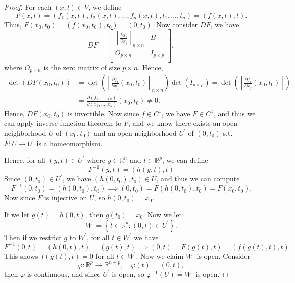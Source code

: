 \begin{proof}
    For each \((x, t) \in V\), we define 
    \[
        F(x, t) = (f_1(x, t), f_2(x, t), \dots , f_n(x, t), t_1, \dots , t_n) = (f(x, t), t).
    \] 
    Thus, \(F(x_0, t_0) = (f(x_0, t_0), t_0) = (0, t_0)\). Now consider \(DF\), we have 
    \[
        DF = \begin{bmatrix}
            \left[ \frac{\partial f_i}{\partial x_j}  \right]_{n \times n}  & B \\
            O_{p \times n} & I_{p \times p}  \\
        \end{bmatrix},
    \]  
    where \(O_{p \times n}\) is the zero matrix of size \(p \times n\). Hence,
    \begin{align*}
        \det (DF(x_0, t_0)) &= \det \left( \left[ \frac{\partial f_i}{\partial x_j} (x_0, t_0) \right]_{n \times n}   \right) \det (I_{p \times p}) = \det \left( \left[ \frac{\partial f_i}{\partial x_j} (x_0, t_0) \right]  \right) \\
        &= \frac{\partial (f_1, \dots , f_n)}{\partial (x_1, \dots , x_n)}(x_0, t_0) \neq 0.
    \end{align*} 
    Hence, \(DF(x_0, t_0)\) is invertible. Now since \(f \in C^1\), we have \(F \in C^1\), and thus we can apply inverse function theorem to \(F\), and we know there exists an open neighborhood \(U\) of \((x_0, t_0)\) and an open neighborhood \(U^{\prime} \) of \((0, t_0)\) s.t. \(F: U \to U^{\prime} \) is a homeomorphism.
    
    Hence, for all \((y, t) \in U^{\prime} \) where \(y \in \mathbb{R} ^n\) and \(t \in \mathbb{R} ^p\), we can define 
    \[
        F^{-1}(y, t) = (h(y, t), t)
    \]   
    Since \((0, t_0) \in U^{\prime} \), we have \((h(0, t_0), t_0) \in U\), and thus we can compute
    \[
        F^{-1} (0, t_0) = (h(0, t_0), t_0) \implies (0, t_0) = F(h(0, t_0), t_0) = F(x_0, t_0).
    \]
    Now since \(F\) is injective on \(U\), so \(h(0, t_0) = x_0\). 
    
    If we let \(g(t) = h(0, t)\), then \(g(t_0) = x_0\). Now we let 
    \[
        W^{\prime} = \left\{ t \in \mathbb{R} ^p: (0, t) \in U^{\prime}  \right\}. 
    \]      
    Then if we restrict \(g\) to \(W^{\prime} \), for all \(t \in W^{\prime} \) we have 
    \[
        F^{-1} (0, t) = (h(0, t), t) = (g(t), t) \implies (0, t) = F(g(t), t) = (f(g(t), t), t).
    \] 
    This shows \(f(g(t), t) = 0\) for all \(t \in W^{\prime} \). Now we claim \(W^{\prime} \) is open. Consider 
    \[
        \varphi : \mathbb{R} ^p \to \mathbb{R} ^{n + p}, \quad \varphi (t) = (0, t),
    \]    
    then \(\varphi \) is continuous, and since \(U^{\prime} \) is open, so \(\varphi ^{-1} (U) = W^{\prime} \) is open. 
    

\end{proof}
